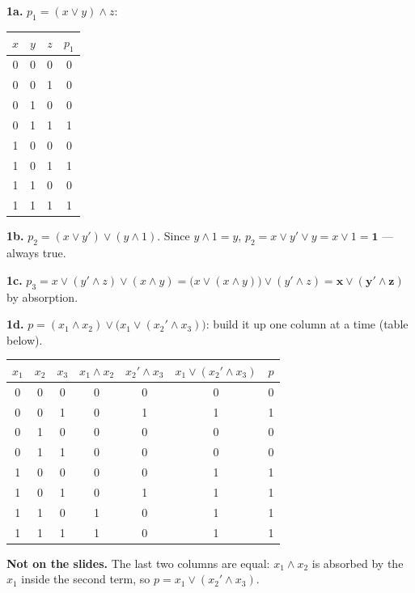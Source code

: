 \documentclass{fkt-notes}
\newcommand{\notslides}[1]{\par\noindent\textbf{Not on the slides.} #1\par}
\theoremstyle{definition}
\begin{document}
\begin{example}[6.5 Ex.~1]\leavevmode\par\noindent
  \begin{minipage}[t]{0.3\textwidth}
    \textbf{1a.} $p_1=(x\vee y)\wedge z$:\\[2pt]
    \small
    \begin{tabular}{@{}ccc|c@{}}
      $x$ & $y$ & $z$ & $p_1$ \\\hline
      0   & 0   & 0   & 0     \\ 0&0&1&0\\ 0&1&0&0\\ 0&1&1&1\\
      1   & 0   & 0   & 0     \\ 1&0&1&1\\ 1&1&0&0\\ 1&1&1&1
    \end{tabular}
  \end{minipage}\hfill
  \begin{minipage}[t]{0.66\textwidth}
    \textbf{1b.} $p_2=(x\vee y')\vee(y\wedge1)$. Since $y\wedge1=y$,
    $p_2=x\vee y'\vee y=x\vee1=\mathbf1$ --- always true.

    \medskip
    \textbf{1c.} $p_3=x\vee(y'\wedge z)\vee(x\wedge y)
      =\bigl(x\vee(x\wedge y)\bigr)\vee(y'\wedge z)=\mathbf{x\vee(y'\wedge z)}$
    by absorption.

    \medskip
    \textbf{1d.} $p=(x_1\wedge x_2)\vee\bigl(x_1\vee(x_2'\wedge x_3)\bigr)$:
    build it up one column at a time (table below).
  \end{minipage}

  \medskip
  \centering\small
  \begin{tabular}{@{}ccc|cccc@{}}
    $x_1$ & $x_2$ & $x_3$ & $x_1\wedge x_2$ & $x_2'\wedge x_3$ & $x_1\vee(x_2'\wedge x_3)$ & $p$ \\\hline
    0     & 0     & 0     & 0               & 0                & 0                         & 0   \\ 0&0&1&0&1&1&1\\ 0&1&0&0&0&0&0\\ 0&1&1&0&0&0&0\\
    1     & 0     & 0     & 0               & 0                & 1                         & 1   \\ 1&0&1&0&1&1&1\\ 1&1&0&1&0&1&1\\ 1&1&1&1&0&1&1
  \end{tabular}

  \raggedright
  \notslides{The last two columns are equal: $x_1\wedge x_2$ is absorbed
    by the $x_1$ inside the second term, so $p=x_1\vee(x_2'\wedge x_3)$.}
\end{example}
\end{document}
